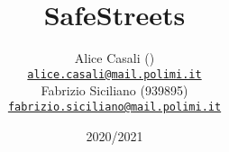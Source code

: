 \title{SafeStreets}
\author{
    Alice Casali ()\\[0cm]
    {\small \href{mailto:alice.casali@mail.polimi.it}{\texttt{alice.casali@mail.polimi.it}}}
    \\[0.5cm]
    Fabrizio Siciliano (939895)\\[0cm]
    {\small \href{mailto:fabrizio.siciliano@mail.polimi.it}{\texttt{fabrizio.siciliano@mail.polimi.it}}}
}
\date{2020/2021}